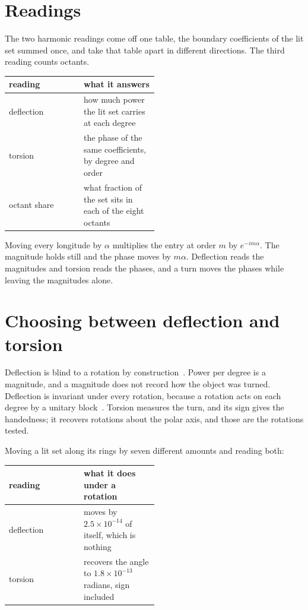 \section{Readings}

The two harmonic readings come off one table, the boundary coefficients of the lit set summed once, and take that table apart in different directions. The third reading counts octants.

\begin{center}
\begin{tabular}{@{}lp{0.5\linewidth}@{}}
\toprule
reading & what it answers \\
\midrule
deflection & how much power the lit set carries at each degree \\
torsion & the phase of the same coefficients, by degree and order \\
octant share & what fraction of the set sits in each of the eight octants \\
\bottomrule
\end{tabular}
\end{center}

Moving every longitude by \(\alpha\) multiplies the entry at order \(m\) by \(e^{-i m \alpha}\). The magnitude holds still and the phase moves by \(m\alpha\). Deflection reads the magnitudes and torsion reads the phases, and a turn moves the phases while leaving the magnitudes alone.

\section{Choosing between deflection and torsion}

Deflection is blind to a rotation by construction~\cite{src:Kazhdan-Funkhouser-and-Rusinkiewicz-2003}. Power per degree is a magnitude, and a magnitude does not record how the object was turned. Deflection is invariant under every rotation, because a rotation acts on each degree by a unitary block~\cite[Section~2, eq.~(15); Section~3, eq.~(52)]{src:Gumerov-and-Duraiswami-2014}. Torsion measures the turn, and its sign gives the handedness; it recovers rotations about the polar axis, and those are the rotations tested.

Moving a lit set along its rings by seven different amounts and reading both:

\begin{center}
\begin{tabular}{@{}lp{0.5\linewidth}@{}}
\toprule
reading & what it does under a rotation \\
\midrule
deflection & moves by \(2.5 \times 10^{-14}\) of itself, which is nothing \\
torsion & recovers the angle to \(1.8 \times 10^{-13}\) radians, sign included \\
\bottomrule
\end{tabular}
\end{center}

